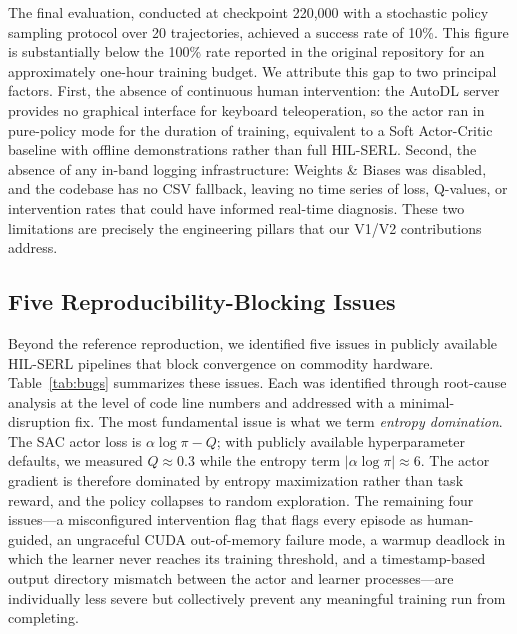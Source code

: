 \documentclass[12pt,a4paper]{article}
\begin{document}
The final evaluation, conducted at checkpoint 220{,}000 with a stochastic policy sampling protocol over 20 trajectories, achieved a success rate of 10\%. This figure is substantially below the 100\% rate reported in the original repository for an approximately one-hour training budget. We attribute this gap to two principal factors. First, the absence of continuous human intervention: the AutoDL server provides no graphical interface for keyboard teleoperation, so the actor ran in pure-policy mode for the duration of training, equivalent to a Soft Actor-Critic baseline with offline demonstrations rather than full HIL-SERL. Second, the absence of any in-band logging infrastructure: Weights \& Biases was disabled, and the codebase has no CSV fallback, leaving no time series of loss, Q-values, or intervention rates that could have informed real-time diagnosis. These two limitations are precisely the engineering pillars that our V1/V2 contributions address.

\subsection{Five Reproducibility-Blocking Issues}

Beyond the reference reproduction, we identified five issues in publicly available HIL-SERL pipelines that block convergence on commodity hardware. Table~\ref{tab:bugs} summarizes these issues. Each was identified through root-cause analysis at the level of code line numbers and addressed with a minimal-disruption fix. The most fundamental issue is what we term \emph{entropy domination}. The SAC actor loss is $\alpha \log \pi - Q$; with publicly available hyperparameter defaults, we measured $Q \approx 0.3$ while the entropy term $|\alpha \log \pi| \approx 6$. The actor gradient is therefore dominated by entropy maximization rather than task reward, and the policy collapses to random exploration. The remaining four issues---a misconfigured intervention flag that flags every episode as human-guided, an ungraceful CUDA out-of-memory failure mode, a warmup deadlock in which the learner never reaches its training threshold, and a timestamp-based output directory mismatch between the actor and learner processes---are individually less severe but collectively prevent any meaningful training run from completing.
\end{document}
